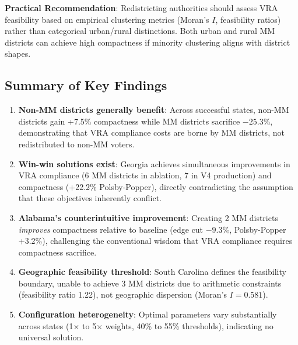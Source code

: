 \textbf{Practical Recommendation}: Redistricting authorities should assess VRA feasibility based on empirical clustering metrics (Moran's $I$, feasibility ratios) rather than categorical urban/rural distinctions. Both urban and rural MM districts can achieve high compactness if minority clustering aligns with district shapes.

\subsection{Summary of Key Findings}

\begin{enumerate}
    \item \textbf{Non-MM districts generally benefit}: Across successful states, non-MM districts gain +7.5\% compactness while MM districts sacrifice $-25.3$\%, demonstrating that VRA compliance costs are borne by MM districts, not redistributed to non-MM voters.

    \item \textbf{Win-win solutions exist}: Georgia achieves simultaneous improvements in VRA compliance (6 MM districts in ablation, 7 in V4 production) and compactness (+22.2\% Polsby-Popper), directly contradicting the assumption that these objectives inherently conflict.

    \item \textbf{Alabama's counterintuitive improvement}: Creating 2 MM districts \emph{improves} compactness relative to baseline (edge cut $-9.3$\%, Polsby-Popper +3.2\%), challenging the conventional wisdom that VRA compliance requires compactness sacrifice.

    \item \textbf{Geographic feasibility threshold}: South Carolina defines the feasibility boundary, unable to achieve 3 MM districts due to arithmetic constraints (feasibility ratio 1.22), not geographic dispersion (Moran's $I = 0.581$).

    \item \textbf{Configuration heterogeneity}: Optimal parameters vary substantially across states (1$\times$ to 5$\times$ weights, 40\% to 55\% thresholds), indicating no universal solution.
\end{enumerate}
